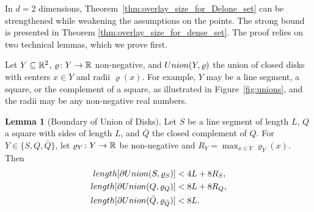 \documentclass[a4paper]{article}
\newcommand {\mm}[1]   {\ifmmode{#1}\else{\mbox{\(#1\)}}\fi}
\newcommand{\Rspace}        {\mm{{\mathbb R}}}
\newcommand{\length}[1]     {\mm{\rm length}{[{#1}]}}
\newcommand{\Union}[2]      {\mm{\rm Union}{({#1},{#2})}}
\theoremstyle{definition}
\numberwithin{theorem}{section}
\newtheorem{lemma}[theorem]{Lemma}
\numberwithin{equation}{section}
\begin{document}
In $d=2$ dimensions, Theorem~\ref{thm:overlay_size_for_Delone_set} can be strengthened while weakening the assumptions on the points. The strong bound is presented in Theorem \ref{thm:overlay_size_for_dense_set}. The proof relies on two technical lemmas, which we prove first.

Let $Y \subseteq \Rspace^2$, $\varrho \colon Y \to \Rspace$ non-negative, and $\Union{Y}{\varrho}$ the union of closed disks with centers $x \in Y$ and radii $\varrho (x)$.
For example, $Y$ may be a line segment, a square, or the complement of a square, as illustrated in Figure~\ref{fig:unions}, and the radii may be any non-negative real numbers.
\begin{lemma}[Boundary of Union of Disks]
  \label{lem:boundary_of_union_of_disks}
  Let $S$ be a line segment of length $L$, $Q$ a square with sides of length $L$, and $\bar{Q}$ the closed complement of $Q$.
  For $Y \in \{S, Q, \bar{Q} \}$, let $\varrho_Y \colon Y \to \Rspace$ be non-negative and $R_Y = \max_{x \in Y} \varrho_Y (x)$.
  Then 
  \begin{align}
    \length{\partial \Union{S}{\varrho_S}} &< 4L+8R_S, 
      \label{eqn:lengthS} \\ 
    \length{\partial \Union{Q}{\varrho_Q}} &< 8L+8R_Q,
      \label{eqn:lengthQ} \\ 
    \length{\partial \Union{\bar{Q}}{\varrho_{\bar{Q}}}} &< 8L.
      \label{eqn:lengthbarQ}
  \end{align}
\end{lemma}
\end{document}
